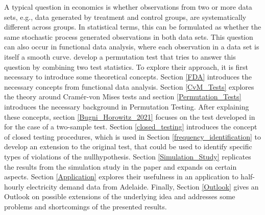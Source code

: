 \documentclass[12pt, a4paper]{article}
\theoremstyle{MAstyle} \newtheorem{assumption}{Assumption}[section]
\theoremstyle{MAstyle} \newtheorem{definition}{Definition}[section]
\theoremstyle{MAstyle} \newtheorem{theorem}{Theorem}[section]
\begin{document}
		A typical question in economics is whether observations from two or more data sets, e.g., data generated by treatment and control groups, are systematically different across groups. In statistical terms, this can be formulated as whether the same stochastic process generated observations in both data sets.				
		This question can also occur in functional data analysis, where each observation in a data set is itself a smooth curve. \cite{bugni_permutation_2021} develop a permutation test that tries to answer this question by combining two test statistics. To explore their approach, it is first necessary to introduce some theoretical concepts.
		Section \ref{FDA} introduces the necessary concepts from functional data analysis. 
		Section \ref{CvM_Tests} explores the theory around Cram\'{e}r-von Mises tests and section \ref{Permutation_Tests} introduces the necessary background in Permutation Testing.
		After explaining these concepts, section \ref{Bugni_Horowitz_2021} focuses on the test developed in \cite{bugni_permutation_2021} for the case of a two-sample test. Section \ref{closed_testing} introduces the concept of closed testing procedures, which is used in Section \ref{frequency_identification} to develop an extension to the original test, that could be used to identify specific types of violations of the nullhypothesis. Section \ref{Simulation_Study} replicates the results from the simulation study in the paper and expands on certain aspects. Section \ref{Application} explores their usefulness in an application to half-hourly electricity demand data from Adelaide.
		Finally, Section \ref{Outlook} gives an Outlook on possible extensions of the underlying idea and addresses some problems and shortcomings of the presented results.
	
\end{document}
